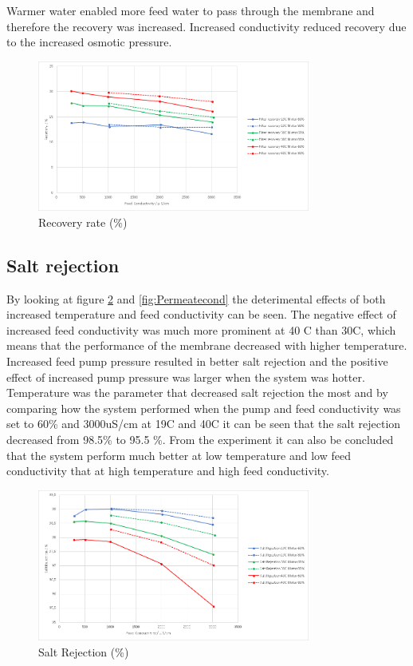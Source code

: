 Warmer water enabled more feed water to pass through the membrane and therefore the recovery was increased. Increased conductivity reduced recovery due to the increased osmotic pressure.

\begin{figure}[H]
    \centering
    \includegraphics[width=0.8\textwidth]{Recovery}
    \caption{Recovery rate (\%)}
    \label{fig:rec}
\end{figure}

\subsection{Salt rejection}

By looking at figure \ref{fig:SaltRejectionResult} and \ref{fig:Permeatecond} the deterimental effects of both increased temperature and feed conductivity can be seen. The negative effect of increased feed conductivity was much more prominent at 40 C than 30C, which means that the performance of the membrane decreased with higher temperature. Increased feed pump pressure resulted in better salt rejection and the positive effect of increased pump pressure was larger when the system was hotter. Temperature was the parameter that decreased salt rejection the most and by comparing how the system performed when the pump and feed conductivity was set to 60\% and 3000uS/cm at 19C and 40C it can be seen that the salt rejection decreased from 98.5\% to 95.5 \%. From the experiment it can also be concluded that the system perform much better at low temperature and low feed conductivity that at high temperature and high feed conductivity. 

\begin{figure}[H]
    \centering
    \includegraphics[width=0.8\textwidth]{SaltRejection}
    \caption{Salt Rejection (\%)}
    \label{fig:SaltRejectionResult}
\end{figure}
 
